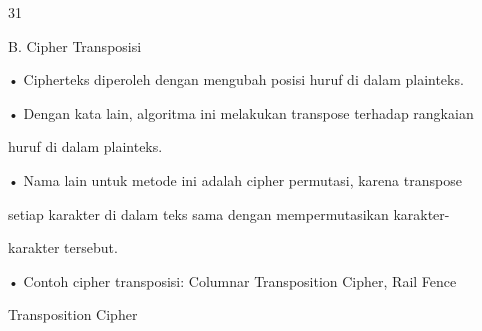 \documentclass{article}
\begin{document}

31

B. Cipher Transposisi

• Cipherteks diperoleh dengan mengubah posisi huruf di dalam plainteks. 

• Dengan kata lain, algoritma ini melakukan transpose terhadap rangkaian 

huruf di dalam plainteks.

• Nama lain untuk metode ini adalah cipher permutasi, karena transpose 

setiap karakter di dalam teks sama dengan mempermutasikan karakter-

karakter tersebut.

• Contoh cipher transposisi: Columnar Transposition Cipher, Rail Fence 

Transposition Cipher
\end{document}
